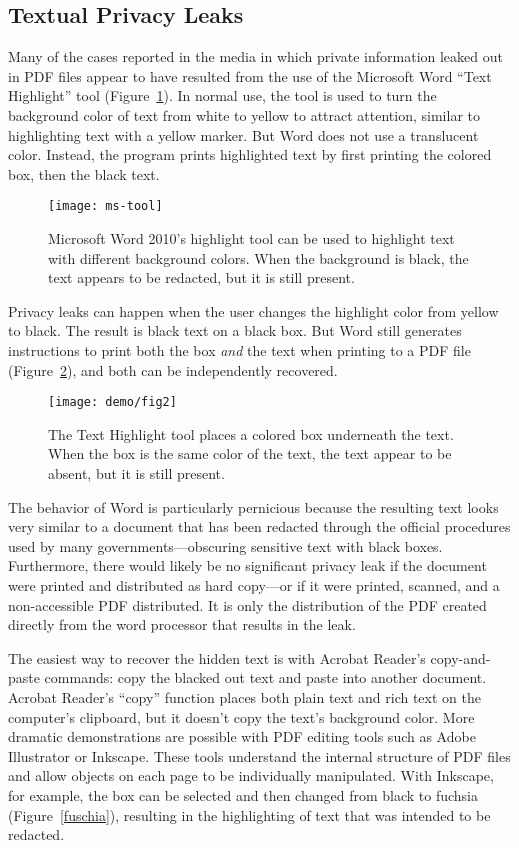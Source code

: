 \subsection{Textual Privacy Leaks}

Many of the cases reported in the media in which private information
leaked out in PDF files appear to have resulted from the use of the
Microsoft Word ``Text Highlight'' tool (Figure~\ref{ms-tool}).  In
normal use, the tool is used to turn the background color of text from
white to yellow to attract
attention, similar to highlighting text with a
yellow marker. But Word does not use a translucent
color. Instead, the program prints highlighted text by first printing
the colored box, then the black text.

\begin{figure}
\texttt{[image: ms-tool]}
\caption{Microsoft Word 2010's highlight tool can be used to highlight
  text with different background colors. When the background is
  black, the text appears to be redacted, but it is still present.}\label{ms-tool}
\end{figure}

Privacy leaks can happen when
the user changes the highlight color from yellow to black. The result
is black text on a black box.  But Word still generates
instructions to print both the  box \emph{and} the 
text when printing to a PDF file (Figure~\ref{demo1}), and both can be
independently recovered. 

\begin{figure}
\texttt{[image: demo/fig2]}
\caption{The Text Highlight tool places a colored box underneath the
  text. When the box is the same color of the text, the text appear to
  be absent, but it is still present.}\label{demo1}
\end{figure}

The behavior of Word is particularly pernicious because the resulting
text looks very similar to a document that has been redacted through
the official procedures used by many governments---obscuring sensitive
text with black boxes. Furthermore, there would likely be no
significant privacy leak if the document were printed and
distributed as hard copy---or if it were printed, scanned, and a non-accessible PDF
distributed. It is only the distribution of the PDF created directly
from the word processor that results in the leak.

The easiest way to recover the hidden text is with Acrobat Reader's
copy-and-paste commands:  copy the blacked out text and paste into
another document. Acrobat Reader's ``copy'' function places both plain text
and rich text on the computer's clipboard, but it doesn't copy the
text's background color. More dramatic demonstrations are possible
with PDF editing tools such as Adobe Illustrator or Inkscape. These tools understand the internal structure of PDF files
and allow objects on each page to be individually manipulated. With
Inkscape, for example, the box can be selected and then changed
from black to fuchsia (Figure~\ref{fuschia}), resulting in the highlighting of text that was intended to be
redacted. 

